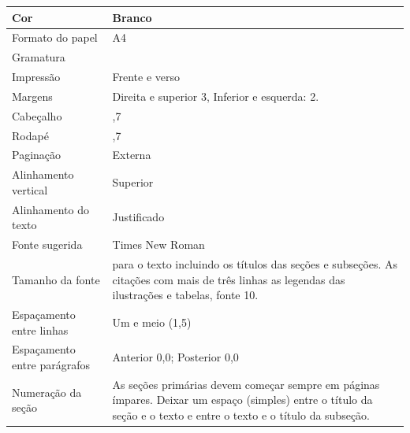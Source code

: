 \begin{tabularx}{\linewidth}{>{\RaggedRight}p{3cm}|>{\arraybackslash}X}
  Cor                          & Branco                                                           \\ \hline
  Formato do papel             & A4                                                               \\ \hline
  Gramatura                    & 75                                                               \\ \hline
  Impressão                    & Frente e verso                                                   \\ \hline
  Margens                      & Direita e superior 3, Inferior e esquerda: 2.                    \\ \hline
  Cabeçalho                    & 0,7                                                              \\ \hline
  Rodapé                       & 0,7                                                              \\ \hline
  Paginação                    & Externa                                                          \\ \hline
  Alinhamento vertical         & Superior                                                         \\ \hline
  Alinhamento do texto         & Justificado                                                      \\ \hline
  Fonte sugerida               & Times New Roman                                                  \\ \hline
  Tamanho da fonte             & 12 para o texto incluindo os títulos das seções e subseções.
                                 As citações com mais de três linhas as legendas das ilustrações
                                 e tabelas, fonte 10.                                             \\ \hline
  Espaçamento entre linhas     & Um e meio (1,5)                                                  \\ \hline
  Espaçamento entre parágrafos & Anterior 0,0; Posterior 0,0                                      \\ \hline
  Numeração da seção           & As seções  primárias devem  começar  sempre em páginas ímpares.
                                 Deixar um espaço (simples) entre o título da seção e o texto e
                                 entre o texto e o título da subseção.                            \\ \hline

\end{tabularx}

